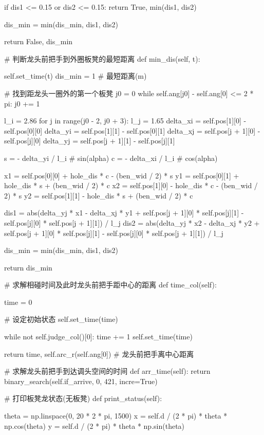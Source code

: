 \documentclass[withoutpreface,bwprint]{cumcmthesis}
\begin{document}
\begin{CodeText}
            if dis1 <= 0.15 or dis2 <= 0.15:
                return True, min(dis1, dis2)

            dis_min = min(dis_min, dis1, dis2)

   return False, dis_min

# 判断龙头前把手到外圈板凳的最短距离
def min_dis(self, t):

   self.set_time(t)
   dis_min = 1 # 最短距离(m)

   # 找到距龙头一圈外的第一个板凳
   j0 = 0
   while self.ang[j0] - self.ang[0] <= 2 * pi:
      j0 += 1

   l_i = 2.86
   for j in range(j0 - 2, j0 + 3):
      l_j = 1.65
      delta_xi = self.pos[1][0] - self.pos[0][0]
      delta_yi = self.pos[1][1] - self.pos[0][1]
      delta_xj = self.pos[j + 1][0] - self.pos[j][0]
      delta_yj = self.pos[j + 1][1] - self.pos[j][1]

      s = - delta_yi / l_i # sin(alpha)
      c = - delta_xi / l_i # cos(alpha)

      x1 = self.pos[0][0] + hole_dis * c - (ben_wid / 2) * s
      y1 = self.pos[0][1] + hole_dis * s + (ben_wid / 2) * c
      x2 = self.pos[1][0] - hole_dis * c - (ben_wid / 2) * s
      y2 = self.pos[1][1] - hole_dis * s + (ben_wid / 2) * c

      dis1 = abs(delta_yj * x1 - delta_xj * y1 + self.pos[j + 1][0] * self.pos[j][1] -
                  self.pos[j][0] * self.pos[j + 1][1]) / l_j
      dis2 = abs(delta_yj * x2 - delta_xj * y2 + self.pos[j + 1][0] * self.pos[j][1] -
                  self.pos[j][0] * self.pos[j + 1][1]) / l_j

      dis_min = min(dis_min, dis1, dis2)

   return dis_min

# 求解相碰时间及此时龙头前把手距中心的距离
def time_col(self):


   time = 0

   # 设定初始状态
   self.set_time(time)

   while not self.judge_col()[0]:
      time += 1
      self.set_time(time)

   return time, self.arc_r(self.ang[0]) # 龙头前把手离中心距离

# 求解龙头前把手到达调头空间的时间
def arr_time(self):
   return binary_search(self.if_arrive, 0, 421, incre=True)

# 打印板凳龙状态(无板凳)
def print_status(self):

   theta = np.linspace(0, 20 * 2 * pi, 1500)
   x = self.d / (2 * pi) * theta * np.cos(theta)
   y = self.d / (2 * pi) * theta * np.sin(theta)


\end{CodeText}
\end{document}
